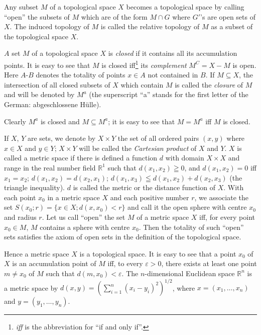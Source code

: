 \begin{definitionu} Any subset $M$ of a topological space $X$ becomes a topological space by calling ``open'' the subsets of $M$ which are of the form $M \cap G$ where $G'$'s are open sets of $X$. The induced topology of $M$ is called the relative topology of $M$ as a subset of the topological space $X$. 
\end{definitionu}

\begin{definitionu} $A$ set $M$ of a topological space $X$ is \emph{closed} if it contains all its accumulation points. It is easy to see that $M$ is closed iff\footnote{\hspace{0.35em}\emph{iff} is the abbreviation for ``if and only if''.} its \emph{complement} $M^{C}=X-M$ is open. Here $A$-$B$ denotes the totality of points $x\in A$ not contained in $B$. If $M\subseteq X$, the intersection of all closed subsets of $X$ which contain $M$ is called the \emph{closure} of $M$ and will be denoted by $M^{a}$ (the superscript ``a'' stands for the first letter of the German: abgeschlossene Hülle). 
\end{definitionu}

Clearly $M^a$ is closed and $M \subseteq M^a$; it is easy to see that $M = M^a$ iff $M$ is closed. 


\begin{definitionu} If $X$, $Y$ are sets, we denote by $X \times Y$ the set of all ordered pairs $(x, y)$ where $x \in X$ and $y \in Y$; $X \times Y$ will be called the \emph{Cartesian product} of $X$ and $Y$. $X$ is called a metric space if there is defined a function $d$ with domain $X \times X$ and range in the real number field $\mathbb{R}^{1}$ such that 
$d(x_1,x_2)\geqq0$, and $d(x_1,x_2)=0$ iff $x_1=x_2$; $d(x_1,x_2)=d(x_2,x_1)$; $d(x_1,x_3)\leqq d(x_1,x_2)+d(x_2,x_3)$ (the triangle inequality).
$d$ is called the metric or the distance function of $X$. With each point $x_{0}$ in a metric space $X$ and each positive number $r$, we associate the set $S(x_{0}; r) = \{x \in X; d(x, x_{0}) < r\}$ and call it the open sphere with centre $x_{0}$ and radius $r$. Let us call ``open'' the set $M$ of a metric space $X$ iff, for every point $x_{0} \in M$, $M$ contains a sphere with centre $x_{0}$. Then the totality of such ``open'' sets satisfies the axiom of open sets in the definition of the topological space. 
\end{definitionu}

Hence a metric space $X$ is a topological space. It is easy to see that a point $x_{0}$ of $X$ is an accumulation point of $M$ iff, to every $\varepsilon > 0$, there exists at least one point $m \neq x_{0}$ of $M$ such that $d(m, x_{0}) < \varepsilon$. The $n$-dimensional Euclidean space $\mathbb{R}^{n}$ is a metric space by 
$d(x,y) = \left(\sum\limits_{i=1}^{n}(x_i- y_i)^2\right)^{1/2}$, where $x = (x_1, \ldots, x_n)$ and $y = (y_1, \ldots, y_n)$. 


